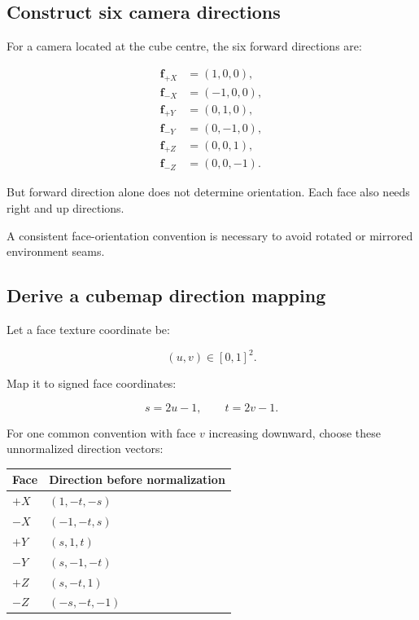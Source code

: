 \subsection{Construct six camera directions}\label{02-foundations-ii-ch035-construct-six-camera-directions}

\hypertarget{02-foundations-ii-ch035-construct-six-camera-directions}{}

For a camera located at the cube centre, the six forward directions are:

\[ \begin{aligned} \mathbf f_{+X}&=(1,0,0),\\ \mathbf f_{-X}&=(-1,0,0),\\ \mathbf f_{+Y}&=(0,1,0),\\ \mathbf f_{-Y}&=(0,-1,0),\\ \mathbf f_{+Z}&=(0,0,1),\\ \mathbf f_{-Z}&=(0,0,-1). \end{aligned} \]

But forward direction alone does not determine orientation. Each face also needs right and up directions.

A consistent face-orientation convention is necessary to avoid rotated or mirrored environment seams.

\subsection{Derive a cubemap direction mapping}\label{02-foundations-ii-ch035-derive-a-cubemap-direction-mapping}

\hypertarget{02-foundations-ii-ch035-derive-a-cubemap-direction-mapping}{}

Let a face texture coordinate be:

\[ (u,v)\in[0,1]^2. \]

Map it to signed face coordinates:

\[ s=2u-1, \qquad t=2v-1. \]

For one common convention with face \(v\) increasing downward, choose these unnormalized direction vectors:

{\def\LTcaptype{none} %
\begin{longtable}[]{@{}ll@{}}
\toprule\noalign{}
Face & Direction before normalization \\
\midrule\noalign{}
\endhead
\bottomrule\noalign{}
\endlastfoot
\(+X\) & \((1,-t,-s)\) \\
\(-X\) & \((-1,-t,s)\) \\
\(+Y\) & \((s,1,t)\) \\
\(-Y\) & \((s,-1,-t)\) \\
\(+Z\) & \((s,-t,1)\) \\
\(-Z\) & \((-s,-t,-1)\) \\
\end{longtable}
}

